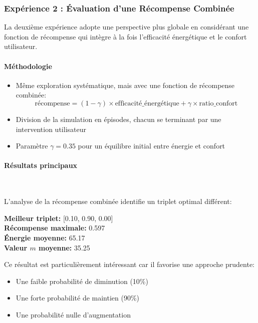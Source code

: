 \documentclass[a4paper,11pt]{article}
\begin{document}
\subsubsection{Expérience 2 : Évaluation d'une Récompense Combinée}

La deuxième expérience adopte une perspective plus globale en considérant une fonction de récompense qui intègre à la fois l'efficacité énergétique et le confort utilisateur.

\paragraph{Méthodologie}
\begin{itemize}
    \item Même exploration systématique, mais avec une fonction de récompense combinée:
    $$\text{récompense} = (1 - \gamma)  \times \text{efficacité\_énergétique} + \gamma \times \text{ratio\_confort}$$
    \item Division de la simulation en épisodes, chacun se terminant par une intervention utilisateur
    \item Paramètre $\gamma=0.35$ pour un équilibre initial entre énergie et confort
\end{itemize}

\paragraph{Résultats principaux}\

L'analyse de la récompense combinée identifie un triplet optimal différent:
\begin{mdframed}
\textbf{Meilleur triplet:} [0.10, 0.90, 0.00]\\
\textbf{Récompense maximale:} 0.597\\
\textbf{Énergie moyenne:} 65.17\\
\textbf{Valeur $m$ moyenne:} 35.25
\end{mdframed}

Ce résultat est particulièrement intéressant car il favorise une approche prudente:
\begin{itemize}
    \item Une faible probabilité de diminution (10\%)
    \item Une forte probabilité de maintien (90\%)
    \item Une probabilité nulle d'augmentation
\end{itemize}
\end{document}

